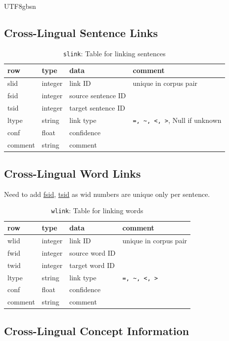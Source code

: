 \documentclass[12pt]{book} %
\newcommand{\fd}[1]{\url{#1}}  %
\begin{document}
\begin{CJK}{UTF8}{gbsn}
\subsection{Cross-Lingual Sentence Links}
\begin{table}[htbp]
\centering

  \begin{tabular}{llll}
  \textbf{row}   &  \textbf{type} & \textbf{data} & \textbf{comment} \\\hline
  slid & integer & link ID & unique in corpus pair \\
  fsid   & integer & source sentence ID & \\
  tsid   & integer & target sentence ID & \\
  ltype  & string  & link type &  \verb|=, ~, <, >|, Null if unknown\\
  conf   & float & confidence \\
  comment & string & comment \\
\hline
\end{tabular}
\caption{\texttt{slink}: Table for linking sentences}
\end{table}

\subsection{Cross-Lingual Word Links}

Need to add \fd{fsid}, \fd{tsid} as wid numbers are unique only per sentence.

\begin{table}[htbp]
\centering
  \begin{tabular}{llll}
  \textbf{row}   &  \textbf{type} & \textbf{data} & \textbf{comment} \\\hline
  wlid & integer & link ID & unique in corpus pair \\
  fwid   & integer & source word ID & \\
  twid   & integer & target word ID & \\
  ltype  & string  & link type &  \verb|=, ~, <, >|\\
  conf   & float & confidence \\
  comment & string & comment \\
\hline
\end{tabular}
\caption{\texttt{wlink}: Table for linking words}
\end{table}

\subsection{Cross-Lingual Concept Information}


\end{CJK}
\end{document}
